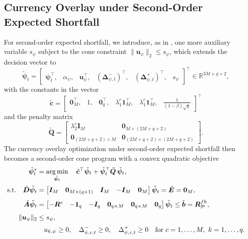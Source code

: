 \subsection{Currency Overlay under Second-Order Expected Shortfall} \label{app:sep_curr_soes}

For second-order expected shortfall, we introduce, as in , one more auxiliary variable $s_\psi$
subject to the cone constraint $\|\bm{u}_\psi\|_2 \le s_\psi$, which extends the decision vector to
\begin{equation*}
    \tilde{\bm{\psi}}_t = \begin{bmatrix} \bm{\psi}_t^\top,& \alpha_\psi,& \bm{u}_\psi^\top,&
    (\bm{\Delta}_{\psi,t}^-)^\top,& (\bm{\Delta}_{\psi,t}^+)^\top,& s_\psi \end{bmatrix}^\top \in \mathbb{R}^{3M+q+2},
\end{equation*}
with the constants in the vector
\begin{equation*}
    \tilde{\bm{c}} = \begin{bmatrix} \bm{0}_M^\top,& 1,& \bm{0}_q^\top,& \lambda_1^c \bm{1}_M^\top,& \lambda_1^c \bm{1}_M^\top,& \tfrac{1}{(1-\beta)\sqrt{q}} \end{bmatrix}^\top
\end{equation*}
and the penalty matrix
\begin{equation*}
    \tilde{\bm{Q}} =
    \begin{bmatrix}
        \lambda_2^c \bm{I}_M & \bm{0}_{M \times (2M+q+2)} \\
        \bm{0}_{(2M+q+2) \times M} & \bm{0}_{(2M+q+2) \times (2M+q+2)}
    \end{bmatrix}.
\end{equation*}
The currency overlay optimization under second-order expected shortfall then becomes a second-order cone program with
a convex quadratic objective
\begin{equation}
\begin{aligned}
    \tilde{\bm{\psi}}_t^* &= \operatorname*{arg\,min}_{\tilde{\bm{\psi}}_t} \quad
     \tilde{\bm{c}}^\top \tilde{\bm{\psi}}_t + \tilde{\bm{\psi}}_t^\top \tilde{\bm{Q}}\, \tilde{\bm{\psi}}_t, \\[2pt]
    \text{s.t.} \quad
    \tilde{\bm{D}} \tilde{\bm{\psi}}_t &=
    \begin{bmatrix} \bm{I}_M & \bm{0}_{M \times (q+1)} & \bm{I}_M & -\bm{I}_M & \bm{0}_M \end{bmatrix} \tilde{\bm{\psi}}_t
    = \tilde{\bm{E}} = \bm{0}_M, \\[4pt]
    \tilde{\bm{A}} \tilde{\bm{\psi}}_t &=
    \begin{bmatrix} -\bm{R}^c & -\bm{1}_q & -\bm{I}_q & \bm{0}_{q \times M} & \bm{0}_{q \times M} & \bm{0}_q \end{bmatrix}
    \tilde{\bm{\psi}}_t \le \tilde{\bm{b}} = \bm{R}^{fh}_{\mathcal{P}}, \\[4pt]
    \|\bm{u}_\psi\|_2 &\le s_\psi, \\[2pt]
    & \quad u_{k,\psi} \ge 0,\quad \Delta_{\psi,c,t}^- \ge 0,\quad \Delta_{\psi,c,t}^+ \ge 0
    \quad \text{for } c = 1, \dots, M,\ k = 1, \dots, q.
\end{aligned}
\end{equation}
